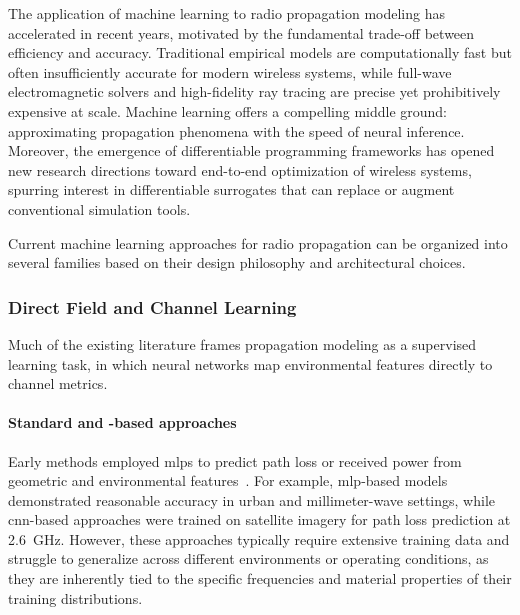 The application of machine learning to radio propagation modeling has accelerated in recent years, motivated by the fundamental trade-off between efficiency and accuracy. Traditional empirical models are computationally fast but often insufficiently accurate for modern wireless systems, while full-wave electromagnetic solvers and high-fidelity ray tracing are precise yet prohibitively expensive at scale. Machine learning offers a compelling middle ground: approximating propagation phenomena with the speed of neural inference. Moreover, the emergence of differentiable programming frameworks has opened new research directions toward end-to-end optimization of wireless systems, spurring interest in differentiable surrogates that can replace or augment conventional simulation tools.

Current machine learning approaches for radio propagation can be organized into several families based on their design philosophy and architectural choices.

\subsubsection{Direct Field and Channel Learning}

Much of the existing literature frames propagation modeling as a supervised learning task, in which neural networks map environmental features directly to channel metrics.

\paragraph{Standard  and -based approaches} Early methods employed \glspl{mlp} to predict path loss or received power from geometric and environmental features~. For example, \gls{mlp}-based models demonstrated reasonable accuracy in urban and millimeter-wave settings, while \gls{cnn}-based approaches were trained on satellite imagery for path loss prediction at \qty{2.6}{\giga\hertz}. However, these approaches typically require extensive training data and struggle to generalize across different environments or operating conditions, as they are inherently tied to the specific frequencies and material properties of their training distributions.

